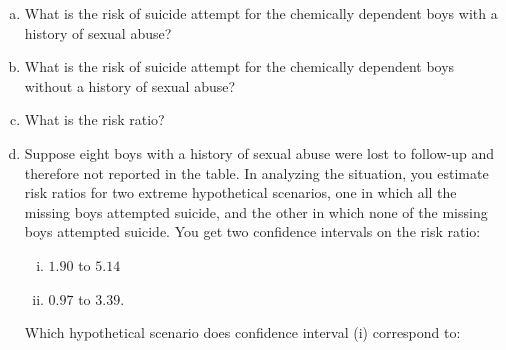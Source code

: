 \begin{enumerate}[(a)]
\item What is the risk of suicide attempt for the chemically dependent boys with a history of sexual abuse?
\begin{MultipleChoice}
\end{MultipleChoice}
\item What is the risk of suicide attempt for the chemically dependent boys without a history of sexual abuse?
\begin{MultipleChoice}
\end{MultipleChoice}
\item What is the risk ratio?
\begin{MultipleChoice}
\end{MultipleChoice}

\item Suppose eight boys with a history of sexual abuse were lost to follow-up and therefore not reported in the table.  In analyzing the situation, you estimate risk ratios for two extreme  hypothetical scenarios, one in which all the missing boys attempted suicide, and the other in which none of the missing boys attempted suicide.  You get two confidence intervals on the risk ratio: 
\begin{enumerate}[(i)]
\item $1.90$ to $5.14$ 
\item $0.97$ to $3.39$.
\end{enumerate}

Which hypothetical scenario does confidence interval (i) correspond to:
\begin{MultipleChoice}
\end{MultipleChoice}
\end{enumerate}